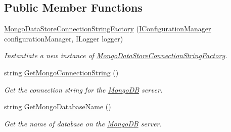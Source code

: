 \subsection*{Public Member Functions}
\begin{DoxyCompactItemize}
\item 
\hyperlink{classCqrs_1_1Mongo_1_1Factories_1_1MongoDataStoreConnectionStringFactory_acad4a48959c7d40b5934663d1b71f414_acad4a48959c7d40b5934663d1b71f414}{Mongo\+Data\+Store\+Connection\+String\+Factory} (\hyperlink{interfaceCqrs_1_1Configuration_1_1IConfigurationManager}{I\+Configuration\+Manager} configuration\+Manager, I\+Logger logger)
\begin{DoxyCompactList}\small\item\em Instantiate a new instance of \hyperlink{classCqrs_1_1Mongo_1_1Factories_1_1MongoDataStoreConnectionStringFactory}{Mongo\+Data\+Store\+Connection\+String\+Factory}. \end{DoxyCompactList}\item 
string \hyperlink{classCqrs_1_1Mongo_1_1Factories_1_1MongoDataStoreConnectionStringFactory_a33064b1b1cbf06ef4f9e12371c7ef785_a33064b1b1cbf06ef4f9e12371c7ef785}{Get\+Mongo\+Connection\+String} ()
\begin{DoxyCompactList}\small\item\em Get the connection string for the \hyperlink{namespaceCqrs_1_1MongoDB}{Mongo\+DB} server. \end{DoxyCompactList}\item 
string \hyperlink{classCqrs_1_1Mongo_1_1Factories_1_1MongoDataStoreConnectionStringFactory_a7f330359f2db5b86ad28ac7d8a4c49f1_a7f330359f2db5b86ad28ac7d8a4c49f1}{Get\+Mongo\+Database\+Name} ()
\begin{DoxyCompactList}\small\item\em Get the name of database on the \hyperlink{namespaceCqrs_1_1MongoDB}{Mongo\+DB} server. \end{DoxyCompactList}\end{DoxyCompactItemize}
